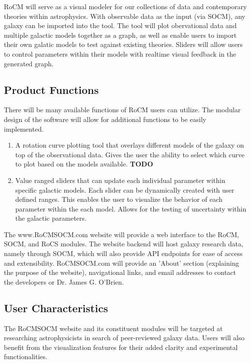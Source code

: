 \documentclass[titlepage]{article}
\begin{document}
RoCM will serve as a visual modeler for our collections of data and contemporary theories within astrophysics. With observable data as the input (via SOCM), any galaxy can be imported into the tool. The tool will plot obervational data and multiple galactic models together as a graph, as well as enable users to import their own galatic models to test against existing theories. Sliders will allow users to control parameters within their models with realtime visual feedback in the generated graph.

\subsection{Product Functions}
There will be many available functions of RoCM users can utilize. The modular design of the software will allow for additional functions to be easily implemented.
\begin{enumerate}
	\item A rotation curve plotting tool that overlays different models of the galaxy on top of the observational data. Gives the user the ability to select which curve to plot based on the models available. \textbf{\LARGE TODO}
	\item Value ranged sliders that can update each individual parameter within specific galactic models. Each slider can be dynamically created with user defined ranges. This enables the user to visualize the behavior of each parameter within the each model. Allows for the testing of uncertainty within the galactic parameters.
\end{enumerate}

The www.RoCMSOCM.com website will provide a web interface to the RoCM, SOCM, and RoCS modules. The website backend will host galaxy research data, namely through SOCM, which will also provide API endpoints for ease of access and extensibility. RoCMSOCM.com will provide an 'About' section (explaining the purpose of the website), navigational links, and email addresses to contact the developers or Dr. James G. O'Brien.


\subsection{User Characteristics}
The RoCMSOCM website and its constituent modules will be targeted at researching astrophysicists in search of peer-reviewed galaxy data. Users will also benefit from the visualization features for their added clarity and experimental functionalities. 
\end{document}

